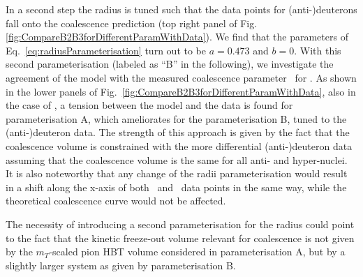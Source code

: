 In a second step the radius is tuned such that the data points for (anti-)deuterons fall onto the coalescence prediction (top right panel of Fig. \ref{fig:CompareB2B3forDifferentParamWithData}). We find that the parameters of Eq.~\ref{eq:radiusParameterisation} turn out to be $a = 0.473$ and $b = 0$. 
With this second parameterisation (labeled as ``B'' in the following), we investigate the agreement of the model with the measured coalescence parameter \bthree\ for \hethree. As shown in the lower panels of Fig.~\ref{fig:CompareB2B3forDifferentParamWithData}, also in the case of \bthree, a tension between the model and the data is found for parameterisation A, which ameliorates for the parameterisation B, tuned to the (anti-)deuteron data. The strength of this approach is given by the fact that the coalescence volume is constrained with the more differential (anti-)deuteron data assuming that the coalescence volume is the same for all anti- and hyper-nuclei. It is also noteworthy that any change of the radii parameterisation would result in a shift along the x-axis of both \btwo~and \bthree~data points in the same way, while the theoretical coalescence curve would not be affected. 

The necessity of introducing a second parameterisation for the radius could point to the fact that the kinetic freeze-out volume relevant for coalescence is not given by the $m_{T}$-scaled pion HBT volume considered in parameterisation A, but by a slightly larger system as given by parameterisation B.  

